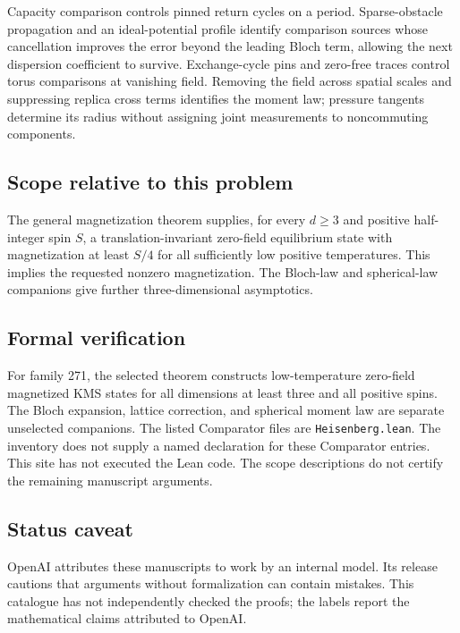 \documentclass[11pt]{article}
\begin{document}
Capacity comparison controls pinned return cycles on a period. Sparse-obstacle propagation and an ideal-potential profile identify comparison sources whose cancellation improves the error beyond the leading Bloch term, allowing the next dispersion coefficient to survive. Exchange-cycle pins and zero-free traces control torus comparisons at vanishing field. Removing the field across spatial scales and suppressing replica cross terms identifies the moment law; pressure tangents determine its radius without assigning joint measurements to noncommuting components.

\subsection{Scope relative to this problem}
The general magnetization theorem supplies, for every $d\ge3$ and positive half-integer spin $S$, a translation-invariant zero-field equilibrium state with magnetization at least $S/4$ for all sufficiently low positive temperatures. This implies the requested nonzero magnetization. The Bloch-law and spherical-law companions give further three-dimensional asymptotics.

\subsection{Formal verification}
For family 271, the selected theorem constructs low-temperature zero-field magnetized KMS states for all dimensions at least three and all positive spins. The Bloch expansion, lattice correction, and spherical moment law are separate unselected companions. The listed Comparator files are \texttt{Heisenberg.lean}. The inventory does not supply a named declaration for these Comparator entries. This site has not executed the Lean code. The scope descriptions do not certify the remaining manuscript arguments.

\subsection{Status caveat}
OpenAI attributes these manuscripts to work by an internal model. Its release cautions that arguments without formalization can contain mistakes. This catalogue has not independently checked the proofs; the labels report the mathematical claims attributed to OpenAI.
\end{document}
